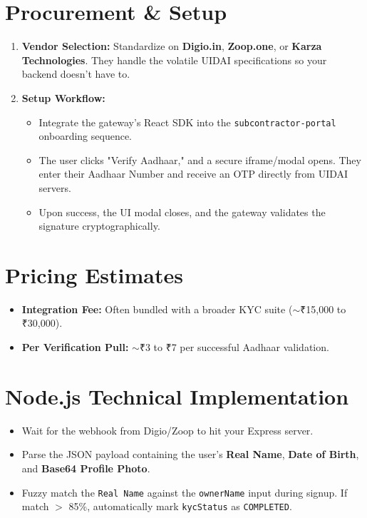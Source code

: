 \documentclass[11pt, a4paper]{report}
\begin{document}
\section{Procurement \& Setup}
\begin{enumerate}[label=\textbf{\textcolor{gryorkBlue}{\arabic*.}}, itemsep=0.3em]
    \item \textbf{Vendor Selection:} Standardize on \textbf{Digio.in}, \textbf{Zoop.one}, or \textbf{Karza Technologies}. They handle the volatile UIDAI specifications so your backend doesn't have to.
    \item \textbf{Setup Workflow:}
        \begin{itemize}
            \item Integrate the gateway's React SDK into the \texttt{subcontractor-portal} onboarding sequence.
            \item The user clicks "Verify Aadhaar," and a secure iframe/modal opens. They enter their Aadhaar Number and receive an OTP directly from UIDAI servers.
            \item Upon success, the UI modal closes, and the gateway validates the signature cryptographically.
        \end{itemize}
\end{enumerate}

\section{Pricing Estimates}
\begin{itemize}
    \item \textbf{Integration Fee:} Often bundled with a broader KYC suite ($\sim$₹15,000 to ₹30,000).
    \item \textbf{Per Verification Pull:} $\sim$₹3 to ₹7 per successful Aadhaar validation.
\end{itemize}

\section{Node.js Technical Implementation}
\begin{itemize}
    \item Wait for the webhook from Digio/Zoop to hit your Express server.
    \item Parse the JSON payload containing the user's \textbf{Real Name}, \textbf{Date of Birth}, and \textbf{Base64 Profile Photo}.
    \item Fuzzy match the \texttt{Real Name} against the \texttt{ownerName} input during signup. If match $>$ 85\%, automatically mark \texttt{kycStatus} as \texttt{COMPLETED}.
\end{itemize}
\end{document}
